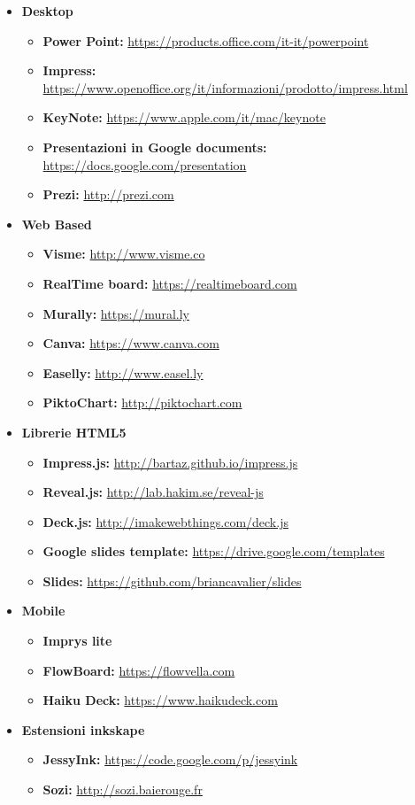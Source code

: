 \begin{itemize}
	\item \textbf{Desktop}
  	\begin{itemize}
  		\item \textbf{Power Point: }\url{https://products.office.com/it-it/powerpoint}
  		\item \textbf{Impress: }\url{https://www.openoffice.org/it/informazioni/prodotto/impress.html}
  		\item \textbf{KeyNote: }\url{https://www.apple.com/it/mac/keynote}
  		\item \textbf{Presentazioni in Google documents: }\url{https://docs.google.com/presentation}
  		\item \textbf{Prezi: }\url{http://prezi.com}
  	\end{itemize}
  	\item \textbf{Web Based}
  	\begin{itemize}
  		\item \textbf{Visme: }\url{http://www.visme.co}
  		\item \textbf{RealTime board: }\url{https://realtimeboard.com}
  		\item \textbf{Murally: }\url{https://mural.ly}
  		\item \textbf{Canva: }\url{https://www.canva.com}
  		\item \textbf{Easelly: }\url{http://www.easel.ly}
  		\item \textbf{PiktoChart: }\url{http://piktochart.com}
  	\end{itemize}
  	  	\item \textbf{Librerie HTML5}
  	\begin{itemize}
  		\item \textbf{Impress.js: }\url{http://bartaz.github.io/impress.js}
  		\item \textbf{Reveal.js: }\url{http://lab.hakim.se/reveal-js}
  		\item \textbf{Deck.js: }\url{http://imakewebthings.com/deck.js}
  		\item \textbf{Google slides template: }\url{https://drive.google.com/templates}
  		\item \textbf{Slides: }\url{https://github.com/briancavalier/slides}
  	\end{itemize}
  	  	\item \textbf{Mobile}
  	\begin{itemize}
  		\item \textbf{Imprys lite }
  		\item \textbf{FlowBoard: }\url{https://flowvella.com}
  		\item \textbf{Haiku Deck: }\url{https://www.haikudeck.com}
  	\end{itemize}
  	  	\item \textbf{Estensioni inkskape}
  	\begin{itemize}
  		\item \textbf{JessyInk: }\url{https://code.google.com/p/jessyink}
  		\item \textbf{Sozi: }\url{http://sozi.baierouge.fr}
  	\end{itemize}
\end{itemize}
